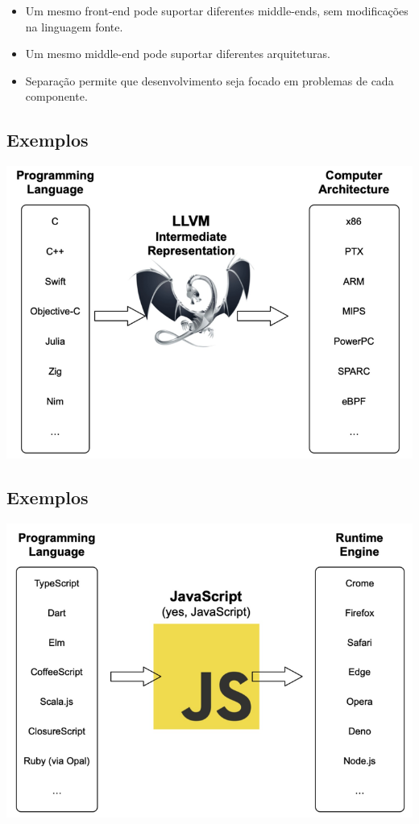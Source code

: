 \documentclass[11pt]{article}
\begin{document}
\begin{itemize}
\item Um mesmo front-end pode suportar diferentes middle-ends, sem modificações na linguagem fonte.
\item Um mesmo middle-end pode suportar diferentes arquiteturas.
\item Separação permite que desenvolvimento seja focado em problemas de cada componente.
\end{itemize}
\subsection*{Exemplos}
\label{sec:orgf6252e0}

\begin{center}
\includegraphics[width=.9\linewidth]{ llvm1.png}
\end{center}
\subsection*{Exemplos}
\label{sec:org34933fe}

\begin{center}
\includegraphics[width=.9\linewidth]{ javascript.png}
\end{center}
\end{document}
